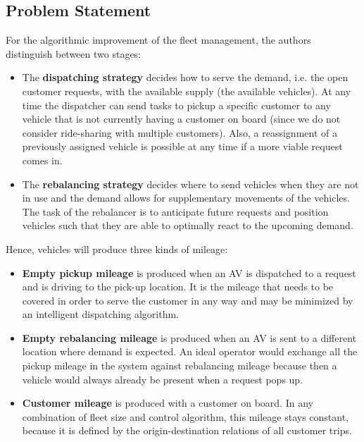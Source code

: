 \subsection{Problem Statement}

For the algorithmic improvement of the fleet management, the authors distinguish between two stages:

\begin{itemize}
\item The \textbf{dispatching strategy} decides how to serve the demand, i.e. the open customer requests, with the available supply (the available vehicles). At any time the dispatcher can send tasks to pickup a specific customer to any vehicle that is not currently having a customer on board (since we do not consider
ride-sharing with multiple customers). Also, a reassignment of a previously assigned vehicle is possible at any time if a more viable request comes in. \item The \textbf{rebalancing strategy} decides where to send vehicles when they are not in use and the demand allows for supplementary movements of the vehicles.
The task of the rebalancer is to anticipate future requests and position vehicles such that they are able to optimally react to the upcoming demand.
\end{itemize}

Hence, vehicles will produce three kinds of mileage:

\begin{itemize}
\item \textbf{Empty pickup mileage} is produced when an AV is dispatched to a request and is driving to the pick-up location. It is the mileage that needs to be covered in order to serve the customer in any way and may be minimized by an intelligent dispatching algorithm. 
\item \textbf{Empty rebalancing mileage} is produced when an AV is sent to a different location where demand is expected. An ideal operator would exchange all the pickup mileage in the system against rebalancing mileage because then a vehicle would always already be present when a request pops up.
\item \textbf{Customer mileage} is produced with a customer on board. In any combination of fleet size and control algorithm, this mileage stays constant, because it is defined by the origin-destination relations of all customer trips.
\end{itemize}

